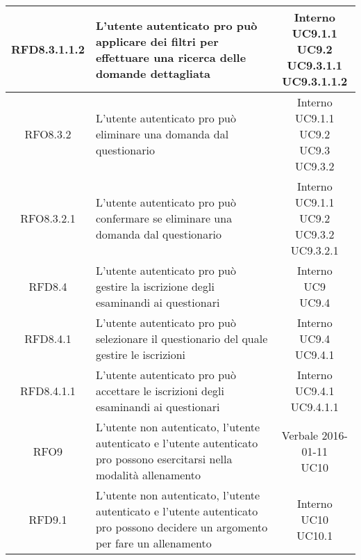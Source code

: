 \begin{longtable}{|c|>{\centering}m{7cm}|c|}
			 \hypertarget{{RFD8.3.1.1.2}}{{RFD8.3.1.1.2}} & L’utente autenticato pro può applicare dei filtri per effettuare una ricerca delle domande dettagliata & \makecell{Interno\\ UC9.1.1 \\UC9.2 \\UC9.3.1.1 \\UC9.3.1.1.2 } \\ \hline
			 \hypertarget{{RFO8.3.2}}{{RFO8.3.2}} & L’utente autenticato pro può eliminare una domanda dal questionario & \makecell{Interno\\ UC9.1.1 \\UC9.2 \\UC9.3 \\UC9.3.2 } \\ \hline
			 \hypertarget{{RFO8.3.2.1}}{{RFO8.3.2.1}} & L’utente autenticato pro può confermare se eliminare una domanda dal questionario & \makecell{Interno\\ UC9.1.1 \\UC9.2 \\UC9.3.2 \\UC9.3.2.1 } \\ \hline
			 \hypertarget{{RFD8.4}}{{RFD8.4}} & L’utente autenticato pro può gestire la iscrizione degli esaminandi ai questionari & \makecell{Interno\\ UC9 \\UC9.4 } \\ \hline
			 \hypertarget{{RFD8.4.1}}{{RFD8.4.1}} & L’utente autenticato pro può selezionare il questionario del quale gestire le iscrizioni & \makecell{Interno\\ UC9.4 \\UC9.4.1 } \\ \hline
			 \hypertarget{{RFD8.4.1.1}}{{RFD8.4.1.1}} & L’utente autenticato pro può accettare le iscrizioni degli esaminandi ai questionari & \makecell{Interno\\ UC9.4.1 \\UC9.4.1.1 } \\ \hline
			 \hypertarget{{RFO9}}{{RFO9}} & L’utente non autenticato, l’utente autenticato e l’utente autenticato pro possono esercitarsi nella modalità allenamento & \makecell{Verbale 2016-01-11\\ UC10 } \\ \hline
			 \hypertarget{{RFD9.1}}{{RFD9.1}} & L'utente non autenticato, l'utente autenticato e l'utente autenticato pro possono decidere un argomento per fare un allenamento & \makecell{Interno\\ UC10 \\UC10.1 } \\ \hline

\end{longtable}

